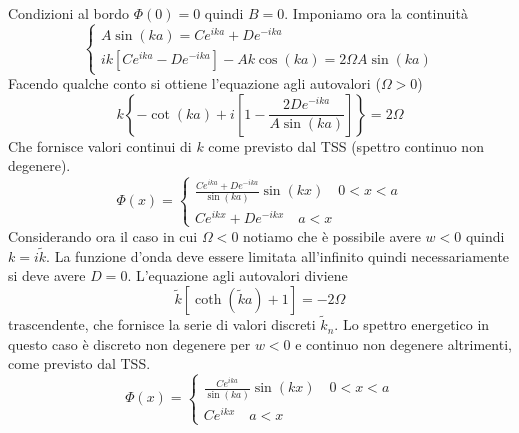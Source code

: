 \documentclass[a4paper]{article}
\begin{document}
        Condizioni al bordo $\Phi(0)=0$ quindi $B=0$.
        Imponiamo ora la continuità
        \begin{equation*}
            \begin{cases}
                A\sin(ka)=Ce^{ika}+De^{-ika}\\
                ik\left[Ce^{ika}-De^{-ika}\right]-Ak\cos(ka)=2\Omega A\sin(ka)
            \end{cases}
        \end{equation*}
        Facendo qualche conto si ottiene l'equazione agli autovalori ($\Omega>0$)
        \begin{equation*}
            k\left\{-\cot(ka)+i\left[1-\frac{2De^{-ika}}{A\sin(ka)}\right]\right\}=2\Omega
        \end{equation*}
        Che fornisce valori continui di $k$ come previsto dal TSS (spettro continuo non degenere).
        \begin{equation*}
            \Phi(x)=
            \begin{cases}
                \frac{Ce^{ika}+De^{-ika}}{\sin(ka)}\sin(kx)\quad 0<x<a\\
                Ce^{ikx}+De^{-ikx}\quad a<x
            \end{cases}
        \end{equation*}
        Considerando ora il caso in cui $\Omega<0$ notiamo che è possibile avere $w<0$ quindi $k=i\tilde{k}$.
        La funzione d'onda deve essere limitata all'infinito quindi necessariamente si deve avere $D=0$.
        L'equazione agli autovalori diviene
        \begin{equation*}
            \tilde{k}\left[\coth(\tilde{k}a)+1\right]=-2\Omega
        \end{equation*}
        trascendente, che fornisce la serie di valori discreti $\tilde{k}_n$.
        Lo spettro energetico in questo caso è discreto non degenere per $w<0$ e continuo non degenere altrimenti, come previsto dal TSS.
        \begin{equation*}
            \Phi(x)=
            \begin{cases}
                \frac{Ce^{ika}}{\sin(ka)}\sin(kx)\quad 0<x<a\\
                Ce^{ikx}\quad a<x
            \end{cases}
        \end{equation*}
        
\end{document}
